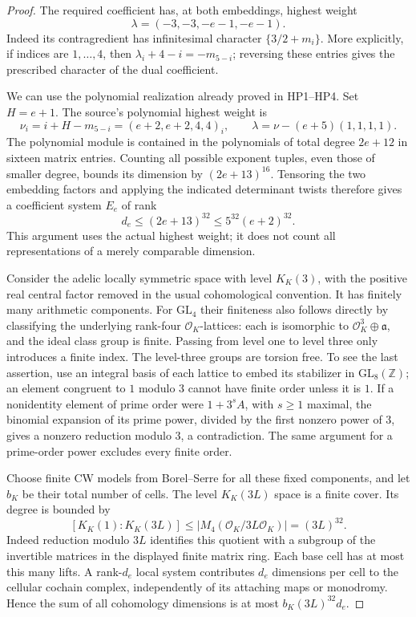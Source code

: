 \begin{proof}
The required coefficient has, at both embeddings, highest weight
\[
 \lambda=(-3,-3,-e-1,-e-1).
                                                               \tag{CX.4}
\]
Indeed its contragredient has infinitesimal character
$\{3/2+m_i\}$.  More explicitly, if indices are $1,\ldots,4$,
then $\lambda_i+4-i=-m_{5-i}$; reversing these entries gives
the prescribed character of the dual coefficient.

We can use the polynomial realization already proved in
HP1--HP4.  Set $H=e+1$.  The source's polynomial highest weight
is
\[
 \nu_i=i+H-m_{5-i}=(e+2,e+2,4,4)_i,
 \qquad \lambda=\nu-(e+5)(1,1,1,1).
                                                               \tag{CX.5}
\]
The polynomial module is contained in the polynomials of total
degree $2e+12$ in sixteen matrix entries.  Counting all possible
exponent tuples, even those of smaller degree, bounds its
dimension by $(2e+13)^{16}$.  Tensoring the two embedding factors
and applying the indicated determinant twists therefore gives a
coefficient system $E_e$ of rank
\[
             d_e\le(2e+13)^{32}\le5^{32}(e+2)^{32}.
                                                               \tag{CX.6}
\]
This argument uses the actual highest weight; it does not count
all representations of a merely comparable dimension.

Consider the adelic locally symmetric space with level $K_K(3)$,
with the positive real central factor removed in the usual
cohomological convention.  It has finitely many arithmetic
components.  For $\mathrm{GL}_4$ their finiteness also follows
directly by classifying the underlying rank-four
$\mathcal O_K$-lattices: each is isomorphic to
$\mathcal O_K^3\oplus\mathfrak a$, and the ideal class group is
finite.  Passing from level one to level three only introduces a
finite index.  The level-three groups are torsion free.  To see
the last assertion, use an integral basis of each lattice to
embed its stabilizer in $\mathrm{GL}_8(\mathbb Z)$; an element
congruent to $1$ modulo $3$ cannot have finite order unless it is
$1$.  If a nonidentity element of prime order were
$1+3^sA$, with $s\ge1$ maximal, the binomial expansion of its
prime power, divided by the first nonzero power of $3$, gives a
nonzero reduction modulo $3$, a contradiction.  The same
argument for a prime-order power excludes every finite order.

Choose finite CW models from Borel--Serre for all these fixed
components, and let $b_K$ be their total number of cells.  The
level $K_K(3L)$ space is a finite cover.  Its degree is bounded by
\[
 [K_K(1):K_K(3L)]
 \le\bigl|M_4(\mathcal O_K/3L\mathcal O_K)\bigr|
 =(3L)^{32}.                                                  \tag{CX.7}
\]
Indeed reduction modulo $3L$ identifies this quotient with a
subgroup of the invertible matrices in the displayed finite
matrix ring.  Each base cell has at most this many lifts.  A
rank-$d_e$ local system contributes $d_e$ dimensions per cell to
the cellular cochain complex, independently of its attaching
maps or monodromy.  Hence the sum of all cohomology dimensions
is at most $b_K(3L)^{32}d_e$.


\end{proof}
